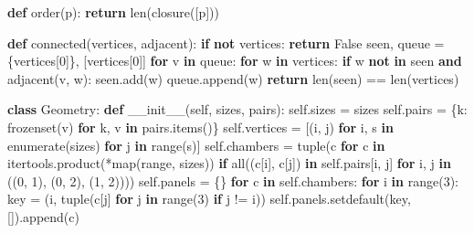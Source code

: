 \documentclass[
  10pt,
  letterpaper,
]{article}
\newenvironment{Shaded}{}{}
\newcommand{\BuiltInTok}[1]{\textcolor[rgb]{0.00,0.50,0.00}{#1}}
\newcommand{\ControlFlowTok}[1]{\textcolor[rgb]{0.00,0.44,0.13}{\textbf{#1}}}
\newcommand{\DecValTok}[1]{\textcolor[rgb]{0.25,0.63,0.44}{#1}}
\newcommand{\FunctionTok}[1]{\textcolor[rgb]{0.02,0.16,0.49}{#1}}
\newcommand{\KeywordTok}[1]{\textcolor[rgb]{0.00,0.44,0.13}{\textbf{#1}}}
\newcommand{\NormalTok}[1]{#1}
\newcommand{\OperatorTok}[1]{\textcolor[rgb]{0.40,0.40,0.40}{#1}}
\newcommand{\VariableTok}[1]{\textcolor[rgb]{0.10,0.09,0.49}{#1}}
\begin{document}
\begin{Shaded}
\begin{Highlighting}[]
\KeywordTok{def}\NormalTok{ order(p):}
    \ControlFlowTok{return} \BuiltInTok{len}\NormalTok{(closure([p]))}


\KeywordTok{def}\NormalTok{ connected(vertices, adjacent):}
    \ControlFlowTok{if} \KeywordTok{not}\NormalTok{ vertices:}
        \ControlFlowTok{return} \VariableTok{False}
\NormalTok{    seen, queue }\OperatorTok{=}\NormalTok{ \{vertices[}\DecValTok{0}\NormalTok{]\}, [vertices[}\DecValTok{0}\NormalTok{]]}
    \ControlFlowTok{for}\NormalTok{ v }\KeywordTok{in}\NormalTok{ queue:}
        \ControlFlowTok{for}\NormalTok{ w }\KeywordTok{in}\NormalTok{ vertices:}
            \ControlFlowTok{if}\NormalTok{ w }\KeywordTok{not} \KeywordTok{in}\NormalTok{ seen }\KeywordTok{and}\NormalTok{ adjacent(v, w):}
\NormalTok{                seen.add(w)}
\NormalTok{                queue.append(w)}
    \ControlFlowTok{return} \BuiltInTok{len}\NormalTok{(seen) }\OperatorTok{==} \BuiltInTok{len}\NormalTok{(vertices)}


\KeywordTok{class}\NormalTok{ Geometry:}
    \KeywordTok{def} \FunctionTok{\_\_init\_\_}\NormalTok{(}\VariableTok{self}\NormalTok{, sizes, pairs):}
        \VariableTok{self}\NormalTok{.sizes }\OperatorTok{=}\NormalTok{ sizes}
        \VariableTok{self}\NormalTok{.pairs }\OperatorTok{=}\NormalTok{ \{k: }\BuiltInTok{frozenset}\NormalTok{(v) }\ControlFlowTok{for}\NormalTok{ k, v }\KeywordTok{in}\NormalTok{ pairs.items()\}}
        \VariableTok{self}\NormalTok{.vertices }\OperatorTok{=}\NormalTok{ [(i, j) }\ControlFlowTok{for}\NormalTok{ i, s }\KeywordTok{in} \BuiltInTok{enumerate}\NormalTok{(sizes) }\ControlFlowTok{for}\NormalTok{ j }\KeywordTok{in} \BuiltInTok{range}\NormalTok{(s)]}
        \VariableTok{self}\NormalTok{.chambers }\OperatorTok{=} \BuiltInTok{tuple}\NormalTok{(c }\ControlFlowTok{for}\NormalTok{ c }\KeywordTok{in}\NormalTok{ itertools.product(}\OperatorTok{*}\BuiltInTok{map}\NormalTok{(}\BuiltInTok{range}\NormalTok{, sizes))}
                              \ControlFlowTok{if} \BuiltInTok{all}\NormalTok{((c[i], c[j]) }\KeywordTok{in} \VariableTok{self}\NormalTok{.pairs[i, j]}
                                     \ControlFlowTok{for}\NormalTok{ i, j }\KeywordTok{in}\NormalTok{ ((}\DecValTok{0}\NormalTok{, }\DecValTok{1}\NormalTok{), (}\DecValTok{0}\NormalTok{, }\DecValTok{2}\NormalTok{), (}\DecValTok{1}\NormalTok{, }\DecValTok{2}\NormalTok{))))}
        \VariableTok{self}\NormalTok{.panels }\OperatorTok{=}\NormalTok{ \{\}}
        \ControlFlowTok{for}\NormalTok{ c }\KeywordTok{in} \VariableTok{self}\NormalTok{.chambers:}
            \ControlFlowTok{for}\NormalTok{ i }\KeywordTok{in} \BuiltInTok{range}\NormalTok{(}\DecValTok{3}\NormalTok{):}
\NormalTok{                key }\OperatorTok{=}\NormalTok{ (i, }\BuiltInTok{tuple}\NormalTok{(c[j] }\ControlFlowTok{for}\NormalTok{ j }\KeywordTok{in} \BuiltInTok{range}\NormalTok{(}\DecValTok{3}\NormalTok{) }\ControlFlowTok{if}\NormalTok{ j }\OperatorTok{!=}\NormalTok{ i))}
                \VariableTok{self}\NormalTok{.panels.setdefault(key, []).append(c)}


\end{Highlighting}
\end{Shaded}
\end{document}

